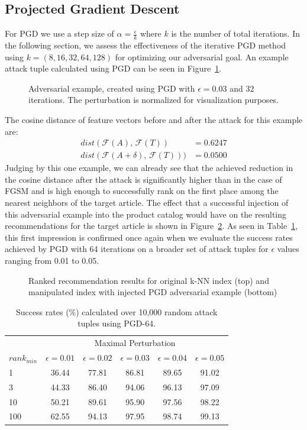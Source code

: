 \subsection{Projected Gradient Descent}
For \acl{PGD} we use a step size of $\alpha=\frac{\epsilon}{k}$ where $k$ is the number of total iterations. In the following section, we assess the effectiveness of the iterative \acl{PGD} method using $k=(8, 16, 32, 64, 128)$ for optimizing our adversarial goal. An example attack tuple calculated using \ac{PGD} can be seen in Figure~\ref{fig:pgd-example}. 
\begin{figure}[H]
	\centering
	
	\caption{Adversarial example, created using \acs{PGD} with $\epsilon = 0.03$ and $32$ iterations. The perturbation is normalized for visualization purposes.}
	\label{fig:pgd-example}
\end{figure}
The cosine distance of feature vectors before and after the attack for this example are:
\begin{align}
dist(\mathcal{F}(A),\,\mathcal{F}(T)) &= 0.6247 \\
dist(\mathcal{F}(A + \delta),\,\mathcal{F}(T))) &= 0.0500
\end{align}
Judging by this one example, we can already see that the achieved reduction in the cosine distance after the attack is significantly higher than in the case of \ac{FGSM} and is high enough to successfully rank on the first place among the nearest neighbors of the target article. The effect that a successful injection of this adversarial example into the product catalog would have on the resulting recommendations for the target article is shown in Figure~\ref{fig:pgd-reco}. As seen in Table~\ref{tab:pgd-results}, this first impression is confirmed once again when we evaluate the success rates achieved by \ac{PGD} with 64 iterations on a broader set of attack tuples for $\epsilon$ values ranging from 0.01 to 0.05.
\begin{figure}[H]
	\centering
	
	\caption{Ranked recommendation results for original \acs{k-NN} index (top) and manipulated index with injected \acs{PGD} adversarial example (bottom)}
	\label{fig:pgd-reco}
\end{figure}
\begin{table}[H]
	\centering
	\begin{tabular}{ lccccc } 
		\toprule		
		& \multicolumn{5}{c}{Maximal Perturbation} \\
		\cmidrule{2-6}
		$rank_{min}$ & $\epsilon = 0.01$ & $\epsilon = 0.02$ & $\epsilon = 0.03$  & $\epsilon = 0.04$ & $\epsilon = 0.05$  \\
		\midrule
		1 & 36.44 & 77.81 & 86.81 & 89.65 & 91.02 \\
		3 & 44.33 & 86.40 & 94.06 & 96.13 & 97.09 \\
		10 & 50.21 & 89.61 & 95.90 & 97.56 & 98.22 \\
		100 & 62.55 & 94.13 & 97.95 & 98.74 & 99.13 \\
		\bottomrule
	\end{tabular}
	\caption{Success rates (\%) calculated over 10,000 random attack tuples using \acs{PGD}-64.}
	\label{tab:pgd-results}
\end{table}
